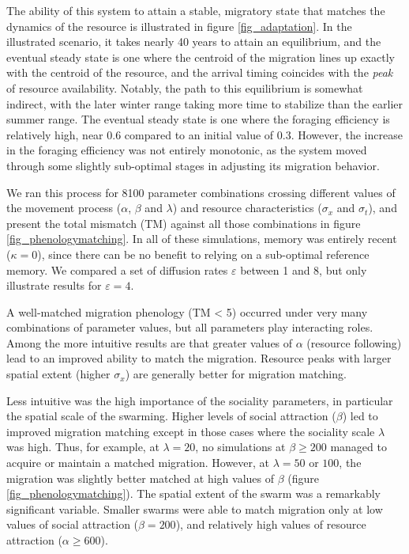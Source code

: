 \documentclass[utf8]{frontiersSCNS} %
\begin{document}
	The ability of this system to attain a stable, migratory state that matches the dynamics of the resource is illustrated in figure \ref{fig_adaptation}. In the illustrated scenario, it takes nearly 40 years to attain an equilibrium, and the eventual steady state is one where the centroid of the migration lines up exactly with the centroid of the resource, and the arrival timing coincides with the \emph{peak} of resource availability. Notably, the path to this equilibrium is somewhat indirect, with the later winter range taking more time to stabilize than the earlier summer range. The eventual steady state is one where the foraging efficiency is relatively high, near 0.6 compared to an initial value of 0.3.  However, the increase in the foraging efficiency was not entirely monotonic, as the system moved through some slightly sub-optimal stages in adjusting its migration behavior. 
	
	We ran this process for 8100 parameter combinations crossing different values of the movement process ($\alpha$, $\beta$ and $\lambda$) and resource characteristics ($\sigma_x$ and $\sigma_t$), and present the total mismatch (TM) against all those combinations in figure \ref{fig_phenologymatching}. In all of these simulations, memory was entirely recent ($\kappa = 0$), since there can be no benefit to relying on a sub-optimal reference memory. We compared a set of diffusion rates $\varepsilon$ between 1 and 8, but only illustrate results for $\varepsilon = 4$. 
	
	A well-matched migration phenology (TM < 5) occurred under very many combinations of parameter values, but all parameters play interacting roles.  Among the more intuitive results are that greater values of $\alpha$ (resource following) lead to an improved ability to match the migration. Resource peaks with larger spatial extent (higher $\sigma_x$) are generally better for migration matching. 
	
	Less intuitive was the high importance of the sociality parameters, in particular the spatial scale of the swarming. Higher levels of social attraction ($\beta$) led to improved migration matching except in those cases where the sociality scale $\lambda$ was high. Thus, for example, at $\lambda = 20$, no simulations at $\beta \geq 200$ managed to acquire or maintain a matched migration. However, at $\lambda = 50$ or $100$, the migration was slightly better matched at high values of $\beta$ (figure \ref{fig_phenologymatching}). The spatial extent of the swarm was a remarkably significant variable. Smaller swarms were able to match migration only at low values of social attraction ($\beta = 200$), and relatively high values of resource attraction ($\alpha \geq 600$).
	
\end{document}
